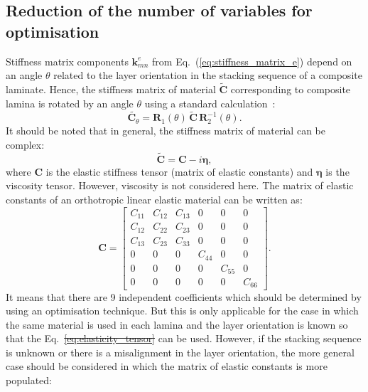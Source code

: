 \documentclass[preprint,12pt]{elsarticle}
\newcommand{\matr}[1]{\mathbf{#1}} %
\newcommand{\bs}[1]{\boldsymbol{#1}}
\providecommand{\DIFaddtex}[1]{{\protect\color{blue}\uwave{#1}}} %
\providecommand{\DIFdeltex}[1]{{\protect\color{red}\sout{#1}}}                      %
\providecommand{\DIFaddbegin}{} %
\providecommand{\DIFaddend}{} %
\providecommand{\DIFdelbegin}{} %
\providecommand{\DIFdelend}{} %
\providecommand{\DIFadd}[1]{\texorpdfstring{\DIFaddtex{#1}}{#1}} %
\providecommand{\DIFdel}[1]{\texorpdfstring{\DIFdeltex{#1}}{}} %
\begin{document}
 \subsection{Reduction of the number of variables for optimisation}
 Stiffness matrix components $\matr{k}_{mn}^e$ from Eq.~(\ref{eq:stiffness_matrix_e}) depend on an angle $\theta$ related to the layer orientation in the stacking sequence of a composite laminate. Hence, the stiffness matrix of material $\tilde{\matr{C}}$ corresponding to composite lamina is rotated by an angle $\theta$ using a standard calculation~\cite{Bartoli2006,Taupin2011}:
 \begin{equation}
	\tilde{ \matr{C}_{\theta}}= \matr{R}_1(\theta) \,\tilde{\matr{C}} \,\matr{R}_2^{-1}(\theta).
	 \label{eq:elasticity_tensor}
 \end{equation}
 It should be noted that in general, the stiffness matrix of material can be complex:
 \begin{equation}
 \tilde{\matr{C}}= \matr{C} - i \bs{\eta},
 \label{eq:complex_elasticity_tensor}
 \end{equation}
 where $\matr{C} $ is the elastic stiffness tensor (matrix of elastic constants) and $\bs{\eta}$ is the viscosity tensor. However, viscosity is not considered here. The matrix of elastic constants of an orthotropic linear elastic material can be written as:
 \begin{equation}
 \matr{C} = \left[\begin{array}{cccccc} C_{11} & C_{12}& C_{13} & 0&0&0\\[2pt]
 C_{12}& C_{22} & C_{23}& 0&0&0\\[2pt]
 C_{13}&C_{23}&C_{33}&0&0&0\\[2pt]
 0& 0 &0&C_{44}& 0&0\\[2pt]
 0&0&0&0&C_{55}&0\\[2pt]
  0&0&0&0&0&C_{66}
  \end{array}\right]. 
  \label{eq:elastic_constatns}
 \end{equation} 
 It means that there are 9 independent coefficients which should be determined by using an optimisation technique. But this is only applicable for the case in which the same material is used in each lamina and the layer orientation is known so that the Eq.~\DIFdelbegin \DIFdel{\ref{eq:elasticity_tensor} }\DIFdelend \DIFaddbegin \DIFadd{(\ref{eq:elasticity_tensor}) }\DIFaddend can be used. However, if the stacking sequence is unknown or there is a misalignment in the layer orientation, the more general case should be considered in which the matrix of elastic constants is more populated:
\end{document}
